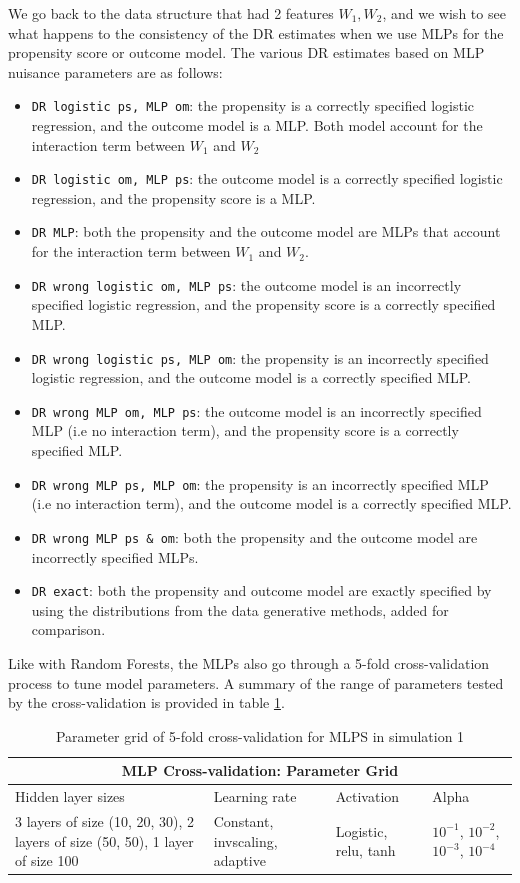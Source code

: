 \documentclass[12pt,twoside]{article}
\begin{document}
We go back to the data structure that had 2 features $W_1,W_2$, and we wish to see what happens to the consistency of the DR estimates when we use MLPs for the propensity score or outcome model. The various DR estimates based on MLP nuisance parameters are as follows: 
\begin{itemize}
    \item \texttt{DR logistic ps, MLP om}: the propensity is a correctly specified logistic regression, and the outcome model is a MLP. Both model account for the interaction term between $W_1$ and $W_2$
    \item \texttt{DR logistic om, MLP ps}: the outcome model is a correctly specified logistic regression, and the propensity score is a MLP.
    \item \texttt{DR MLP}: both the propensity and the outcome model are MLPs that account for the interaction term between $W_1$ and $W_2$.
    \item \texttt{DR wrong logistic om, MLP ps}: the outcome model is an incorrectly specified logistic regression, and the propensity score is a correctly specified MLP.
    \item \texttt{DR wrong logistic ps, MLP om}: the propensity is an incorrectly specified logistic regression, and the outcome model is a correctly specified MLP.
    \item \texttt{DR wrong MLP om, MLP ps}: the outcome model is an incorrectly specified MLP (i.e no interaction term), and the propensity score is a correctly specified MLP.
    \item \texttt{DR wrong MLP ps, MLP om}: the propensity is an incorrectly specified MLP (i.e no interaction term), and the outcome model is a correctly specified MLP.
    \item \texttt{DR wrong MLP ps \& om}: both the propensity and the outcome model are incorrectly specified MLPs.
    \item \texttt{DR exact}: both the propensity and outcome model are exactly specified by using the distributions from the data generative methods, added for comparison.
\end{itemize}

Like with Random Forests, the MLPs also go through a 5-fold cross-validation process to tune model parameters. A summary of the range of parameters tested by the cross-validation is provided in table \ref{tableMLP}.

\begin{table}[h!]
    \centering
\begin{tabular}{ |p{3cm}|p{3cm}|p{3cm}|p{3cm}| }
 \hline
 \multicolumn{4}{|c|}{MLP Cross-validation: Parameter Grid} \\
 \hline
 Hidden layer sizes & Learning rate & Activation & Alpha\\
 \hline
 3 layers of size (10, 20, 30), 2 layers of size (50, 50), 1 layer of size 100 & Constant, invscaling, adaptive & Logistic, relu, tanh & $10^{-1}$, $10^{-2}$, $10^{-3}$, $10^{-4}$ \\
 \hline 
\end{tabular}
\caption{Parameter grid of 5-fold cross-validation for MLPS in simulation 1}
\label{tableMLP}
\end{table}
\end{document}
